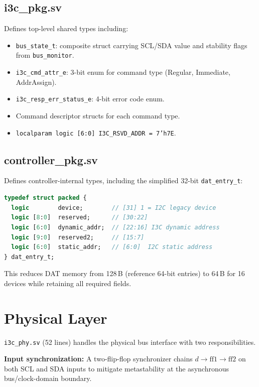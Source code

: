 \documentclass[12pt, a4paper, oneside]{report}
\newcommand{\file}[1]{\texttt{#1}}
\newcommand{\module}[1]{\texttt{#1}}
\begin{document}
\subsection{i3c\_pkg.sv}

Defines top-level shared types including:
\begin{itemize}
  \item \texttt{bus\_state\_t}: composite struct carrying SCL/SDA value and stability
        flags from \module{bus\_monitor}.
  \item \texttt{i3c\_cmd\_attr\_e}: 3-bit enum for command type (Regular, Immediate,
        AddrAssign).
  \item \texttt{i3c\_resp\_err\_status\_e}: 4-bit error code enum.
  \item Command descriptor structs for each command type.
  \item \texttt{localparam logic [6:0] I3C\_RSVD\_ADDR = 7'h7E}.
\end{itemize}

\subsection{controller\_pkg.sv}

Defines controller-internal types, including the simplified 32-bit \texttt{dat\_entry\_t}:

\begin{lstlisting}[language=SystemVerilog, caption={Simplified 32-bit DAT entry type}]
typedef struct packed {
  logic        device;        // [31] 1 = I2C legacy device
  logic [8:0]  reserved;      // [30:22]
  logic [6:0]  dynamic_addr;  // [22:16] I3C dynamic address
  logic [9:0]  reserved2;     // [15:7]
  logic [6:0]  static_addr;   // [6:0]  I2C static address
} dat_entry_t;
\end{lstlisting}

This reduces DAT memory from 128\,B (reference 64-bit entries) to 64\,B for 16
devices while retaining all required fields.

\section{Physical Layer}

\file{i3c\_phy.sv} (52 lines) handles the physical bus interface with two
responsibilities.

\textbf{Input synchronization:} A two-flip-flop synchronizer chains
$d \rightarrow \text{ff1} \rightarrow \text{ff2}$ on both SCL and SDA inputs to
mitigate metastability at the asynchronous bus/clock-domain boundary.
\end{document}
